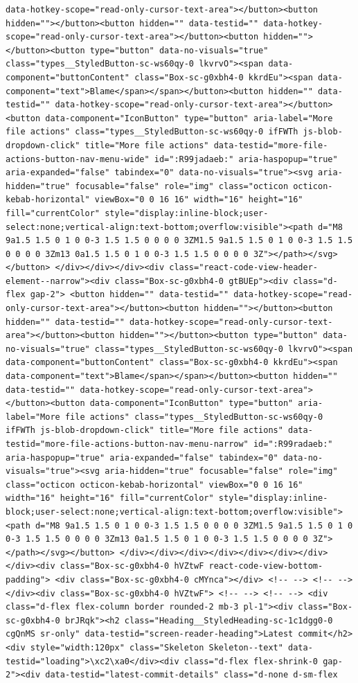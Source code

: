 \documentclass[
  letterpaper,
]{book}
\begin{document}
\begin{verbatim}
data-hotkey-scope="read-only-cursor-text-area"></button><button hidden=""></button><button hidden="" data-testid="" data-hotkey-scope="read-only-cursor-text-area"></button><button hidden=""></button><button type="button" data-no-visuals="true" class="types__StyledButton-sc-ws60qy-0 lkvrvO"><span data-component="buttonContent" class="Box-sc-g0xbh4-0 kkrdEu"><span data-component="text">Blame</span></span></button><button hidden="" data-testid="" data-hotkey-scope="read-only-cursor-text-area"></button><button data-component="IconButton" type="button" aria-label="More file actions" class="types__StyledButton-sc-ws60qy-0 ifFWTh js-blob-dropdown-click" title="More file actions" data-testid="more-file-actions-button-nav-menu-wide" id=":R99jadaeb:" aria-haspopup="true" aria-expanded="false" tabindex="0" data-no-visuals="true"><svg aria-hidden="true" focusable="false" role="img" class="octicon octicon-kebab-horizontal" viewBox="0 0 16 16" width="16" height="16" fill="currentColor" style="display:inline-block;user-select:none;vertical-align:text-bottom;overflow:visible"><path d="M8 9a1.5 1.5 0 1 0 0-3 1.5 1.5 0 0 0 0 3ZM1.5 9a1.5 1.5 0 1 0 0-3 1.5 1.5 0 0 0 0 3Zm13 0a1.5 1.5 0 1 0 0-3 1.5 1.5 0 0 0 0 3Z"></path></svg></button> </div></div></div><div class="react-code-view-header-element--narrow"><div class="Box-sc-g0xbh4-0 gtBUEp"><div class="d-flex gap-2"> <button hidden="" data-testid="" data-hotkey-scope="read-only-cursor-text-area"></button><button hidden=""></button><button hidden="" data-testid="" data-hotkey-scope="read-only-cursor-text-area"></button><button hidden=""></button><button type="button" data-no-visuals="true" class="types__StyledButton-sc-ws60qy-0 lkvrvO"><span data-component="buttonContent" class="Box-sc-g0xbh4-0 kkrdEu"><span data-component="text">Blame</span></span></button><button hidden="" data-testid="" data-hotkey-scope="read-only-cursor-text-area"></button><button data-component="IconButton" type="button" aria-label="More file actions" class="types__StyledButton-sc-ws60qy-0 ifFWTh js-blob-dropdown-click" title="More file actions" data-testid="more-file-actions-button-nav-menu-narrow" id=":R99radaeb:" aria-haspopup="true" aria-expanded="false" tabindex="0" data-no-visuals="true"><svg aria-hidden="true" focusable="false" role="img" class="octicon octicon-kebab-horizontal" viewBox="0 0 16 16" width="16" height="16" fill="currentColor" style="display:inline-block;user-select:none;vertical-align:text-bottom;overflow:visible"><path d="M8 9a1.5 1.5 0 1 0 0-3 1.5 1.5 0 0 0 0 3ZM1.5 9a1.5 1.5 0 1 0 0-3 1.5 1.5 0 0 0 0 3Zm13 0a1.5 1.5 0 1 0 0-3 1.5 1.5 0 0 0 0 3Z"></path></svg></button> </div></div></div></div></div></div></div></div><div class="Box-sc-g0xbh4-0 hVZtwF react-code-view-bottom-padding"> <div class="Box-sc-g0xbh4-0 cMYnca"></div> <!-- --> <!-- --> </div><div class="Box-sc-g0xbh4-0 hVZtwF"> <!-- --> <!-- --> <div class="d-flex flex-column border rounded-2 mb-3 pl-1"><div class="Box-sc-g0xbh4-0 brJRqk"><h2 class="Heading__StyledHeading-sc-1c1dgg0-0 cgQnMS sr-only" data-testid="screen-reader-heading">Latest commit</h2><div style="width:120px" class="Skeleton Skeleton--text" data-testid="loading">\xc2\xa0</div><div class="d-flex flex-shrink-0 gap-2"><div data-testid="latest-commit-details" class="d-none d-sm-flex 
\end{verbatim}
\end{document}
